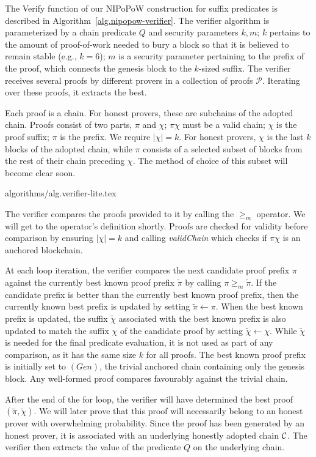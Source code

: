 The \textsf{Verify} function of our NIPoPoW construction  for suffix predicates
is described in
Algorithm~\ref{alg.nipopow-verifier}. The verifier algorithm is parameterized by
a chain predicate $Q$ and security parameters $k, m$; $k$
pertains to the amount of proof-of-work needed to bury a block so that it is
believed to remain stable (e.g., $k = 6$); $m$ is a security
parameter pertaining to the prefix of the proof, which connects the genesis
block to the $k$-sized suffix. The verifier receives several proofs by
different provers in a collection of proofs $\mathcal{P}$. Iterating over these
proofs, it extracts the best.

Each proof is a chain. For honest provers, these are subchains of the  adopted
chain. Proofs consist of two parts, $\pi$ and $\chi$; $\pi \chi$ must be a valid
chain; $\chi$ is the proof suffix; $\pi$ is the prefix. We require $|\chi| = k$.
For honest provers, $\chi$ is the last $k$ blocks of the adopted chain, while
$\pi$ consists of a selected subset of blocks from the rest of their chain
preceding $\chi$. The method of choice of this subset will become clear soon.

{algorithms/alg.verifier-lite.tex}

The verifier compares the proofs provided to it by calling the $\geq_m$
operator. We will get to the operator's definition
shortly. Proofs are checked for validity before comparison by ensuring $|\chi| =
k$ and calling \textit{validChain} which checks if $\pi\chi$ is an anchored
blockchain.

At each loop iteration, the verifier compares the next candidate proof prefix
$\pi$ against the currently best known proof prefix $\tilde\pi$ by calling $\pi
\geq_m \tilde\pi$. If the candidate prefix is better than the currently best
known proof prefix, then the currently known best prefix is updated by setting
$\tilde\pi \leftarrow \pi$. When the best known prefix is updated, the suffix
$\tilde\chi$ associated with the best known prefix is also updated to match the
suffix $\chi$ of the candidate proof by setting $\tilde\chi \leftarrow \chi$.
While $\tilde\chi$ is needed for the final predicate evaluation, it is not used
as part of any comparison, as it has the same size $k$ for all proofs. The best
known proof prefix is initially set to $(Gen)$, the trivial anchored chain
containing only the genesis block. Any well-formed proof compares favourably
against the trivial chain.

After the end of the for loop, the verifier will have determined the best proof
$(\tilde\pi, \tilde\chi)$. We will later prove that this proof will necessarily
belong to an honest prover with overwhelming probability. Since the proof has
been generated by an honest prover, it is associated with an underlying honestly
adopted chain $\mathcal{C}$. The verifier then extracts the value of the predicate
$Q$ on the underlying chain.


